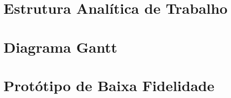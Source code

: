 \chapter{Estrutura Analítica de Trabalho}
\label{sec:EAP}




\chapter{Diagrama Gantt}
\label{sec:Gantt}




\chapter{Protótipo de Baixa Fidelidade}
\label{sec:prototipoBaixa}


